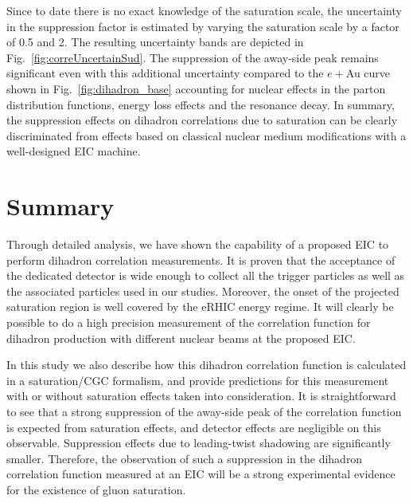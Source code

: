 Since to date there is no exact knowledge of the saturation scale, the
uncertainty in the suppression factor is estimated by varying the saturation
scale by a factor of 0.5 and 2. The resulting uncertainty bands are depicted in
Fig.~\ref{fig:correUncertainSud}. The suppression of the away-side peak remains
significant even with this additional uncertainty compared to the $e+$Au curve
shown in Fig.~\ref{fig:dihadron_base} accounting for nuclear effects in the
parton distribution functions, energy loss effects and the resonance decay. In
summary, the suppression effects on dihadron correlations due to saturation can
be clearly discriminated from effects based on classical nuclear medium
modifications with a well-designed EIC machine.


\section{Summary}\label{sec:dihadronsummary}

Through detailed analysis, we have shown the capability of a proposed EIC
to perform dihadron correlation measurements. It
is proven that the acceptance of the dedicated detector is wide enough to
collect all the trigger particles as well as the associated particles used in our
studies. Moreover, the onset of the projected saturation region is well covered by
the eRHIC energy regime. It will clearly be possible to do a high
precision measurement of the correlation function for dihadron production with
different nuclear beams at the proposed EIC.

In this study we also describe how this dihadron correlation function is
calculated in a saturation/CGC formalism, and provide predictions for this
measurement with or without saturation effects taken into consideration. It is
straightforward to see that a strong suppression of the away-side peak of the
correlation function is expected from saturation effects, and detector effects are
negligible on this observable. Suppression effects due to leading-twist
shadowing are significantly smaller. Therefore, the observation of such
a suppression in the dihadron correlation function measured at an EIC will be a
strong experimental evidence for the existence of gluon saturation.

